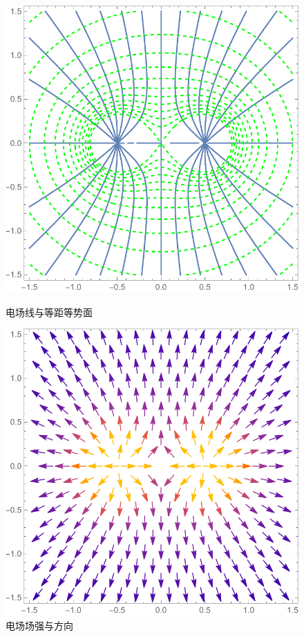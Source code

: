 \begin{figure}[H]
\begin{minipage}[b]{0.4\linewidth}
\centering
\includegraphics[width=\textwidth]{pic_data/T/dltzdh_p1.pdf}
\caption{电场线与等距等势面}
\end{minipage}
\hfill
\begin{minipage}[b]{0.4\linewidth}
\centering
\includegraphics[width=\textwidth]{pic_data/T/dltzdh_p2.pdf}
\caption{电场场强与方向\protect \footnotemark}
\end{minipage}
\end{figure}

